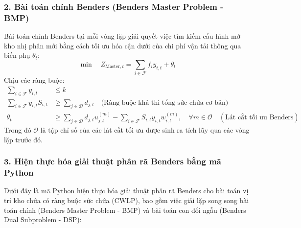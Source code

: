 \subsubsection{2. Bài toán chính Benders (Benders Master Problem - BMP)}
Bài toán chính Benders tại mỗi vòng lặp giải quyết việc tìm kiếm cấu hình mở kho nhị phân mới bằng cách tối ưu hóa cận dưới của chi phí vận tải thông qua biến phụ $\theta_t$:
\begin{equation}
    \min \quad Z_{\text{Master}, t} = \sum_{i \in \mathcal{F}} f_i y_{i,t} + \theta_t
\end{equation}
Chịu các ràng buộc:
\begin{align}
    \sum_{i \in \mathcal{F}} y_{i,t} &\le k \\
    \sum_{i \in \mathcal{F}} y_{i,t} S_{i,t} &\ge \sum_{j \in \mathcal{D}} d_{j,t} \quad \text{(Ràng buộc khả thi tổng sức chứa cơ bản)} \\
    \theta_t &\ge \sum_{j \in \mathcal{D}} d_{j,t} u_{j,t}^{(m)} - \sum_{i \in \mathcal{F}} S_{i,t} y_{i,t} w_{i,t}^{(m)}, \quad \forall m \in \mathcal{O} \quad (\text{Lát cắt tối ưu Benders})
\end{align}
Trong đó $\mathcal{O}$ là tập chỉ số của các lát cắt tối ưu được sinh ra tích lũy qua các vòng lặp trước đó.

\subsubsection{3. Hiện thực hóa giải thuật phân rã Benders bằng mã Python}
Dưới đây là mã Python hiện thực hóa giải thuật phân rã Benders cho bài toán vị trí kho chứa có ràng buộc sức chứa (CWLP), bao gồm việc giải lặp song song bài toán chính (Benders Master Problem - BMP) và bài toán con đối ngẫu (Benders Dual Subproblem - DSP):

